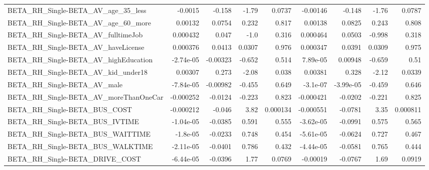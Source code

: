 \begin{tabular}{lrrrrrrrr}
BETA\_RH\_Single-BETA\_AV\_age\_35\_less                 &     -0.0015 &       -0.158 &    -1.79 &   0.0737 &   -0.00146 &      -0.148 &        -1.76 &        0.0787 \\
BETA\_RH\_Single-BETA\_AV\_age\_60\_more                 &     0.00132 &       0.0754 &    0.232 &    0.817 &    0.00138 &      0.0825 &        0.243 &         0.808 \\
BETA\_RH\_Single-BETA\_AV\_fulltimeJob                 &    0.000432 &        0.047 &     -1.0 &    0.316 &   0.000464 &      0.0503 &       -0.998 &         0.318 \\
BETA\_RH\_Single-BETA\_AV\_haveLicense                 &    0.000376 &       0.0413 &   0.0307 &    0.976 &   0.000347 &      0.0391 &       0.0309 &         0.975 \\
BETA\_RH\_Single-BETA\_AV\_highEducation               &   -2.74e-05 &     -0.00323 &   -0.652 &    0.514 &   7.89e-05 &     0.00948 &       -0.659 &          0.51 \\
BETA\_RH\_Single-BETA\_AV\_kid\_under18                 &     0.00307 &        0.273 &    -2.08 &    0.038 &    0.00381 &       0.328 &        -2.12 &        0.0339 \\
BETA\_RH\_Single-BETA\_AV\_male                        &   -7.84e-05 &     -0.00982 &   -0.455 &    0.649 &   -3.1e-07 &   -3.99e-05 &       -0.459 &         0.646 \\
BETA\_RH\_Single-BETA\_AV\_moreThanOneCar              &   -0.000252 &      -0.0124 &   -0.223 &    0.823 &  -0.000421 &     -0.0202 &       -0.221 &         0.825 \\
BETA\_RH\_Single-BETA\_BUS\_COST                       &   -0.000212 &       -0.046 &     3.82 & 0.000134 &  -0.000551 &     -0.0781 &         3.35 &      0.000811 \\
BETA\_RH\_Single-BETA\_BUS\_IVTIME                     &   -1.04e-05 &      -0.0385 &    0.591 &    0.555 &  -3.62e-05 &     -0.0991 &        0.575 &         0.565 \\
BETA\_RH\_Single-BETA\_BUS\_WAITTIME                   &    -1.8e-05 &      -0.0233 &    0.748 &    0.454 &  -5.61e-05 &     -0.0624 &        0.727 &         0.467 \\
BETA\_RH\_Single-BETA\_BUS\_WALKTIME                   &   -2.11e-05 &      -0.0401 &    0.786 &    0.432 &  -4.44e-05 &     -0.0581 &        0.765 &         0.444 \\
BETA\_RH\_Single-BETA\_DRIVE\_COST                     &   -6.44e-05 &      -0.0396 &     1.77 &   0.0769 &   -0.00019 &     -0.0767 &         1.69 &        0.0919 \\

\end{tabular}
